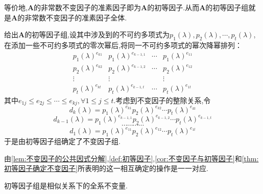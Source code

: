 \begin{green}
\begin{corollary}[不变因子与初等因子]\label{cor:不变因子与初等因子}
     等价地,$\bm{A}$的非常数不变因子的准素因子即为$\bm{A}$的初等因子.从而$\bm{A}$的初等因子组就是$\bm{A}$的非常数不变因子的准素因子全体.
\end{corollary}
\end{green}
\begin{formal}
\begin{theorem}[初等因子确定不变因子]\label{thm:初等因子确定不变因子}
    给出$\bm{A}$的初等因子组,设其中涉及到的不可约多项式为$p_1\left(\lambda\right),p_2\left(\lambda\right),\cdots,p_t\left(\lambda\right)$,在添加一些不可约多项式的零次幂后,将同一不可约多项式的幂次降幂排列：
    \[
    \begin{matrix}
        p_1\left(\lambda\right)^{e_{k1}}&p_1\left(\lambda\right)^{e_{k-1,1}}&\cdots&p_1\left(\lambda\right)^{e_{11}}\\
        p_2\left(\lambda\right)^{e_{k2}}&p_2\left(\lambda\right)^{e_{k-1,2}}&\cdots&p_2\left(\lambda\right)^{e_{12}}\\
        \vdots&\vdots&&\vdots\\
        p_t\left(\lambda\right)^{e_{kt}}&p_t\left(\lambda\right)^{e_{k-1,t}}&\cdots&p_t\left(\lambda\right)^{e_{1t}}
    \end{matrix}
    \]其中$e_{1j}\leqslant e_{2j}\leqslant \cdots\leqslant e_{kj},\forall 1\leqslant j\leqslant t.$考虑到不变因子的整除关系,令\[
    d_k\left(\lambda\right)=p_1\left(\lambda\right)^{e_{k1}}p_2\left(\lambda\right)^{e_{k2}}\cdots p_t\left(\lambda\right)^{e_{kt}}
    \]
    \[
    d_{k-1}\left(\lambda\right)=p_1\left(\lambda\right)^{e_{k-1,1}}p_2\left(\lambda\right)^{e_{k-1,2}}\cdots p_t\left(\lambda\right)^{e_{k-1,t}}
    \]\[
    \cdots\cdots\cdots\cdots
    \]
    \[
    d_1\left(\lambda\right)=p_1\left(\lambda\right)^{e_{11}}p_2\left(\lambda\right)^{e_{12}}\cdots p_t\left(\lambda\right)^{e_{1t}}
    \]于是由初等因子组确定了不变因子组.
\end{theorem}
\end{formal}
\begin{formal}
\begin{theorem}[唯一确定可逆]\label{thm:唯一确定可逆}
    由\cref{lem:不变因子的公共因式分解},\cref{def:初等因子},\cref{cor:不变因子与初等因子}和\cref{thm:初等因子确定不变因子}所表明的这一相互确定的操作是一一对应.
\end{theorem}
\end{formal}
\begin{formal}
\begin{theorem}[全系不变量]\label{thm:全系不变量}
    初等因子组是相似关系下的全系不变量.
\end{theorem}
\end{formal}
